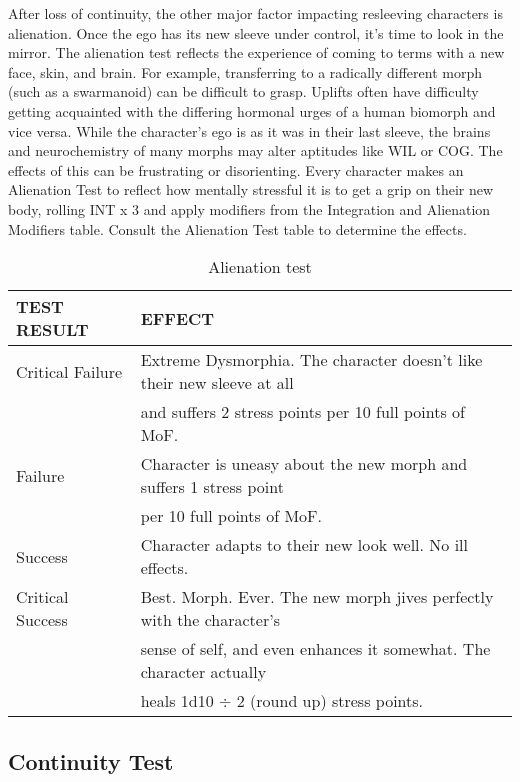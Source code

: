 After loss of continuity, the other major factor impacting resleeving characters is alienation. Once the ego 
has its new sleeve under control, it's time to look in 
the mirror. The alienation test reflects the experience of 
coming to terms with a new face, skin, and brain. For 
example, transferring to a radically different morph 
(such as a swarmanoid) can be difficult to grasp. 
Uplifts often have difficulty getting acquainted with 
the differing hormonal urges of a human biomorph 
and vice versa. While the character's ego is as it was 
in their last sleeve, the brains and neurochemistry of 
many morphs may alter aptitudes like WIL or COG. 
The effects of this can be frustrating or disorienting.
Every character makes an Alienation Test to reflect 
how mentally stressful it is to get a grip on their new 
body, rolling INT x 3 and apply modifiers from the 
Integration and Alienation Modifiers table. Consult 
the Alienation Test table to determine the effects.
\\

\begin{table}
\caption{Alienation test}
\begin{tabular}{|l|l|}
\hline
TEST RESULT & EFFECT \\
\hline
Critical Failure & Extreme Dysmorphia. The character doesn’t like their new sleeve at all \\
& and suffers 2 stress points per 10 full points of MoF. \\
\hline
Failure & Character is uneasy about the new morph and suffers 1 stress point \\
& per 10 full points of MoF. \\
\hline
Success & Character adapts to their new look well. No ill effects. \\
\hline
Critical Success & Best. Morph. Ever. The new morph jives perfectly with the character’s \\
& sense of self, and even enhances it somewhat. The character actually \\
& heals 1d10 $\div$ 2 (round up) stress points. \\
\hline
\end{tabular}
\end{table}

\subsection{Continuity Test}

